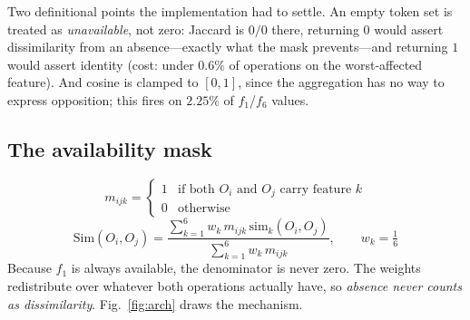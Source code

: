 \documentclass[journal]{IEEEtran}
\begin{document}
Two definitional points the implementation had to settle. An empty token set is
treated as \emph{unavailable}, not zero: Jaccard is $0/0$ there, returning $0$
would assert dissimilarity from an absence---exactly what the mask prevents---and
returning $1$ would assert identity (cost: under $0.6\%$ of operations on the
worst-affected feature). And cosine is clamped to $[0,1]$, since the aggregation
has no way to express opposition; this fires on $2.25\%$ of $f_1$/$f_6$ values.

\subsection{The availability mask}
\begin{equation}
m_{ijk} = \begin{cases}
1 & \text{if both } O_i \text{ and } O_j \text{ carry feature } k\\
0 & \text{otherwise}
\end{cases}
\label{eq:mask}
\end{equation}
\begin{equation}
\mathrm{Sim}(O_i,O_j) =
\frac{\sum_{k=1}^{6} w_k \, m_{ijk} \, \mathrm{sim}_k(O_i,O_j)}
     {\sum_{k=1}^{6} w_k \, m_{ijk}},
\qquad w_k = \tfrac{1}{6}
\label{eq:sim}
\end{equation}
Because $f_1$ is always available, the denominator is never zero. The weights
redistribute over whatever both operations actually have, so \emph{absence never
counts as dissimilarity}. Fig.~\ref{fig:arch} draws the mechanism.
\end{document}
